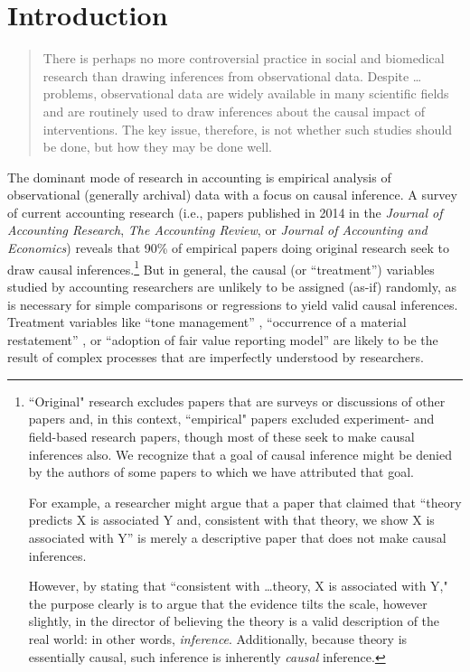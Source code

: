 \documentclass[11pt]{amsart}
\begin{document}
\clearpage

 
\section{Introduction}

\begin{quotation}
	There is perhaps no more controversial practice in social and biomedical research than drawing inferences from observational data.
	Despite \dots problems, observational data are widely available in many scientific fields and are routinely used to draw inferences about the causal impact of interventions.
	The key issue, therefore, is not whether such studies should be done, but how they may be done well.
\end{quotation}


The dominant mode of research in accounting is empirical analysis of observational (generally archival) data with a focus on causal inference.
A survey of current accounting research (i.e., papers published in 2014 in the \textit{Journal of Accounting Research}, \textit{The Accounting Review}, or \textit{Journal of Accounting and Economics}) reveals that 90\% of empirical papers doing original research seek to draw causal inferences.\footnote{``Original" research excludes papers that are surveys or discussions of other papers and, in this context, ``empirical" papers excluded experiment- and field-based research papers, though most of these seek to make causal inferences also. 
We recognize that a goal of causal inference might be denied by the authors of some papers to which we have attributed that goal.

For example, a researcher might argue that a paper that claimed that ``theory predicts X is associated Y and, consistent with that theory, we show X is associated with Y'' is merely a descriptive paper that does not make causal inferences. 

However, by stating that ``consistent with \dots theory, X is associated with Y," the purpose clearly is to argue that the evidence tilts the scale, however slightly, in the director of believing the theory is a valid description of the real world: in other words, \emph{inference}. 
Additionally, because theory is essentially causal, such inference is inherently \emph{causal} inference.} 
But in general, the causal (or ``treatment'') variables studied by accounting researchers are unlikely to be assigned (as-if) randomly, as is necessary for simple comparisons or regressions to yield valid causal inferences.
Treatment variables like ``tone management'' \citep{Huang:2014cs}, ``occurrence of a material restatement'' \citep{Chen:2014ji}, or ``adoption of fair value reporting model'' \citep{Liang:2014ea} are likely to be the result of complex processes that are imperfectly understood by researchers.
\end{document}
